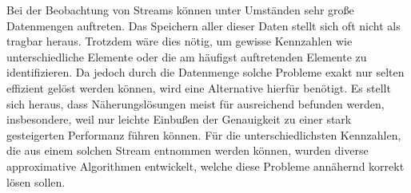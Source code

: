 Bei der Beobachtung von Streams können unter Umständen sehr große Datenmengen auftreten. Das Speichern aller dieser Daten stellt sich oft nicht als tragbar heraus. Trotzdem wäre dies nötig, um gewisse Kennzahlen wie unterschiedliche Elemente oder die am häufigst auftretenden Elemente zu identifizieren. Da jedoch durch die Datenmenge solche Probleme exakt nur selten effizient gelöst werden können, wird eine Alternative hierfür benötigt. Es stellt sich heraus, dass Näherungslösungen meist für ausreichend befunden werden, insbesondere, weil nur leichte Einbußen der Genauigkeit zu einer stark gesteigerten Performanz führen können. Für die unterschiedlichsten Kennzahlen, die aus einem solchen Stream entnommen werden können, wurden diverse approximative Algorithmen entwickelt, welche diese Probleme annähernd korrekt lösen sollen.